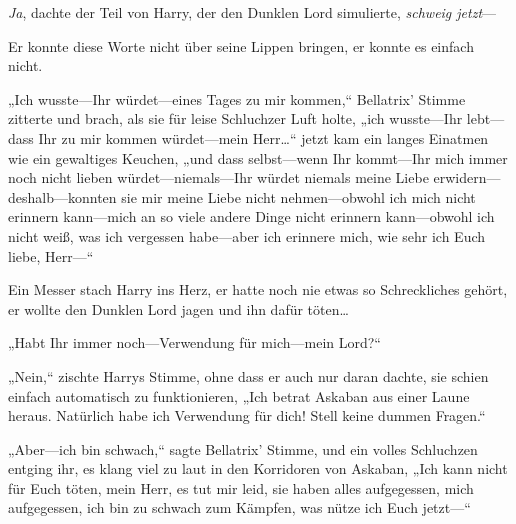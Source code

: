 \emph{Ja}, dachte der Teil von Harry, der den Dunklen Lord simulierte, \emph{schweig jetzt}—

Er konnte diese Worte nicht über seine Lippen bringen, er konnte es einfach nicht.

„Ich wusste—Ihr würdet—eines Tages zu mir kommen,“ Bellatrix' Stimme zitterte und brach, als sie für leise Schluchzer Luft holte, „ich wusste—Ihr lebt—dass Ihr zu mir kommen würdet—mein Herr…“ jetzt kam ein langes Einatmen wie ein gewaltiges Keuchen, „und dass selbst—wenn Ihr kommt—Ihr mich immer noch nicht lieben würdet—niemals—Ihr würdet niemals meine Liebe erwidern—deshalb—konnten sie mir meine Liebe nicht nehmen—obwohl ich mich nicht erinnern kann—mich an so viele andere Dinge nicht erinnern kann—obwohl ich nicht weiß, was ich vergessen habe—aber ich erinnere mich, wie sehr ich Euch liebe, Herr—“

Ein Messer stach Harry ins Herz, er hatte noch nie etwas so Schreckliches gehört, er wollte den Dunklen Lord jagen und ihn dafür töten…

„Habt Ihr immer noch—Verwendung für mich—mein Lord?“

„Nein,“ zischte Harrys Stimme, ohne dass er auch nur daran dachte, sie schien einfach automatisch zu funktionieren, „Ich betrat Askaban aus einer Laune heraus. Natürlich habe ich Verwendung für dich! Stell keine dummen Fragen.“

„Aber—ich bin schwach,“ sagte Bellatrix' Stimme, und ein volles Schluchzen entging ihr, es klang viel zu laut in den Korridoren von Askaban, „Ich kann nicht für Euch töten, mein Herr, es tut mir leid, sie haben alles aufgegessen, mich aufgegessen, ich bin zu schwach zum Kämpfen, was nütze ich Euch jetzt—“

